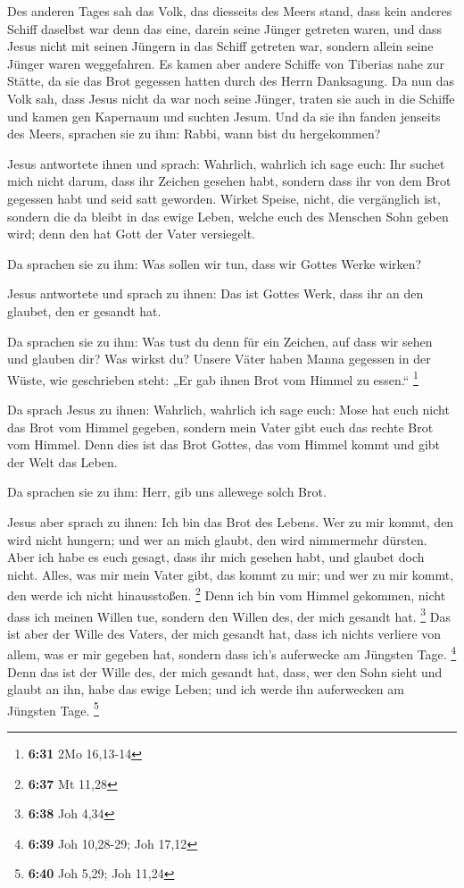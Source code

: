  Des anderen Tages sah das Volk, das diesseits des Meers
stand, dass kein anderes Schiff daselbst war denn das eine, darein seine
Jünger getreten waren, und dass Jesus nicht mit seinen Jüngern in das
Schiff getreten war, sondern allein seine Jünger waren weggefahren.
 Es kamen aber andere Schiffe von Tiberias nahe zur
Stätte, da sie das Brot gegessen hatten durch des Herrn Danksagung.
 Da nun das Volk sah, dass Jesus nicht da war noch seine
Jünger, traten sie auch in die Schiffe und kamen gen Kapernaum und
suchten Jesum.  Und da sie ihn fanden jenseits des Meers,
sprachen sie zu ihm: Rabbi, wann bist du hergekommen?

 Jesus antwortete ihnen und sprach: Wahrlich, wahrlich
ich sage euch: Ihr suchet mich nicht darum, dass ihr Zeichen gesehen
habt, sondern dass ihr von dem Brot gegessen habt und seid satt
geworden.  Wirket Speise, nicht, die vergänglich ist,
sondern die da bleibt in das ewige Leben, welche euch des Menschen Sohn
geben wird; denn den hat Gott der Vater versiegelt.

 Da sprachen sie zu ihm: Was sollen wir tun, dass wir
Gottes Werke wirken?

 Jesus antwortete und sprach zu ihnen: Das ist Gottes
Werk, dass ihr an den glaubet, den er gesandt hat.

 Da sprachen sie zu ihm: Was tust du denn für ein
Zeichen, auf dass wir sehen und glauben dir? Was wirkst du?
 Unsere Väter haben Manna gegessen in der Wüste, wie
geschrieben steht: „Er gab ihnen Brot vom Himmel zu essen.`` \footnote{\textbf{6:31}
  2Mo 16,13-14}

 Da sprach Jesus zu ihnen: Wahrlich, wahrlich ich sage
euch: Mose hat euch nicht das Brot vom Himmel gegeben, sondern mein
Vater gibt euch das rechte Brot vom Himmel.  Denn dies
ist das Brot Gottes, das vom Himmel kommt und gibt der Welt das Leben.

 Da sprachen sie zu ihm: Herr, gib uns allewege solch
Brot.

 Jesus aber sprach zu ihnen: Ich bin das Brot des Lebens.
Wer zu mir kommt, den wird nicht hungern; und wer an mich glaubt, den
wird nimmermehr dürsten.  Aber ich habe es euch gesagt,
dass ihr mich gesehen habt, und glaubet doch nicht. 
Alles, was mir mein Vater gibt, das kommt zu mir; und wer zu mir kommt,
den werde ich nicht hinausstoßen. \footnote{\textbf{6:37} Mt 11,28}
 Denn ich bin vom Himmel gekommen, nicht dass ich meinen
Willen tue, sondern den Willen des, der mich gesandt hat. \footnote{\textbf{6:38}
  Joh 4,34}  Das ist aber der Wille des Vaters, der mich
gesandt hat, dass ich nichts verliere von allem, was er mir gegeben hat,
sondern dass ich's auferwecke am Jüngsten Tage. \footnote{\textbf{6:39}
  Joh 10,28-29; Joh 17,12}  Denn das ist der Wille des,
der mich gesandt hat, dass, wer den Sohn sieht und glaubt an ihn, habe
das ewige Leben; und ich werde ihn auferwecken am Jüngsten Tage.
\footnote{\textbf{6:40} Joh 5,29; Joh 11,24}

